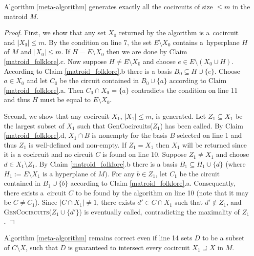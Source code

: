 \begin{thm}
	\label{meta_alg_correctness}
	Algorithm \ref{meta-algorithm} generates exactly all the cocircuits of size $\leq m$ in the matroid $M$.
\end{thm}

\begin{proof}
	First, we show that any set $X_0$ returned by the algorithm is a~cocircuit and $\lvert X_0 \rvert \leq m$. By the condition on line 7, the set $E \setminus X_0$ contains a~hyperplane $H$ of $M$ and $\lvert X_0 \rvert \leq m$. If $H = E \setminus X_0$ then we are done by Claim \ref{matroid_folklore}.c. Now suppose $H \neq E \setminus X_0$ and choose $e \in E \setminus (X_0 \cup H)$. According to Claim \ref{matroid_folklore}.b there is a basis $B_0 \subseteq H \cup \{e\}$. Choose $a \in X_0$ and let $C_0$ be the circuit contained in $B_0 \cup \{a\}$ according to Claim \ref{matroid_folklore}.a. Then $C_0 \cap X_0 = \{a\}$ contradicts the condition on line 11 and thus $H$ must be equal to $E \setminus X_0$.

	Second, we show that any cocircuit $X_1$, $\lvert X_1 \rvert \leq m$, is generated. Let ${Z_1 \subseteq X_1}$ be the largest subset of $X_1$ such that GenCocircuits($Z_1$) has been called. By Claim \ref{matroid_folklore}.d, $X_1 \cap B$ is nonempty for the basis $B$ selected on line $1$ and thus $Z_1$ is well-defined and non-empty.
	If ${Z_1 = X_1}$ then $X_1$ will be returned since it is a cocircuit and no circuit $C$ is found on line $10$. Suppose $Z_1 \neq X_1$ and choose $d \in X_1 \setminus Z_1$. By Claim \ref{matroid_folklore}.b there is a basis $B_1 \subseteq H_1 \cup \{d\}$ (where $H_1 := E \setminus X_1$ is a hyperplane of $M$). For any $b \in Z_1$, let $C_1$ be the circuit contained in $B_1 \cup \{b\}$ according to Claim \ref{matroid_folklore}.a. Consequently, there exists a~circuit $C$ to be found by the algorithm on line 10 (note that it may be $C \neq C_1$). Since $\lvert C \cap X_1 \rvert \neq 1$, there exists $d' \in C \cap X_1$ such that $d'\not\in Z_1$, and \textsc{GenCocircuits}($Z_1 \cup \{d'\}$) is eventually called, contradicting the maximality of $Z_1$.
\end{proof}

\begin{cor}
	\label{cor_circuit_subset}
	Algorithm \ref{meta-algorithm} remains correct even if line 14 sets $D$ to be a subset of $C \setminus X$, such that $D$ is guaranteed to intersect every cocircuit $X_1 \supseteq X$ in $M$.
\end{cor}

